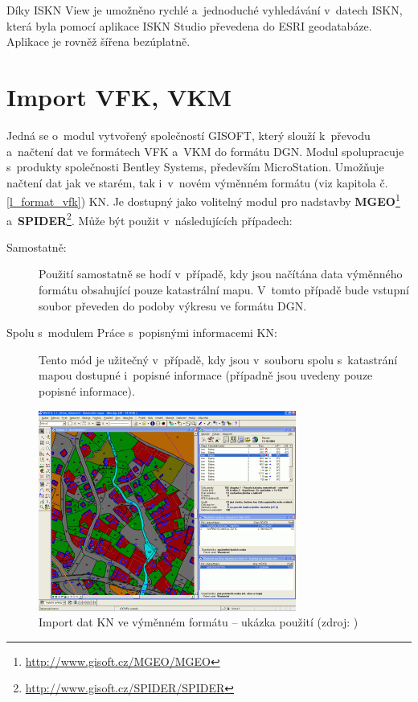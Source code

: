 \documentclass[a4paper,12pt,oneside]{book}
\begin{document}
Díky ISKN View je umožněno rychlé a~jednoduché vyhledávání v~datech
ISKN, která byla pomocí aplikace ISKN Studio převedena do 
ESRI geodatabáze.  Aplikace je rovněž šířena
bezúplatně. \cite{iskn_studio}

\newpage
\section{Import VFK, VKM}
Jedná se o~modul vytvořený společností GISOFT, který slouží k~převodu
a~načtení dat ve formátech VFK a~VKM do formátu DGN. Modul
spolupracuje s~produkty společnosti Bentley Systems, především
MicroStation. Umožňuje načtení dat jak ve starém, tak i~v~novém
výměnném formátu (viz kapitola č. \ref{l_format_vfk}) KN. Je dostupný
jako volitelný modul pro nadstavby
\textbf{MGEO}\footnote{\url{http://www.gisoft.cz/MGEO/MGEO}}
a~\textbf{SPIDER}\footnote{\url{http://www.gisoft.cz/SPIDER/SPIDER}}. Může
být použit v~následujících případech:

\begin{description}
\item[Samostatně:] Použití samostatně se hodí v~případě, kdy jsou
  načítána data výměnného formátu obsahující pouze katastrální
  mapu. V~tomto případě bude vstupní soubor převeden do podoby výkresu
  ve formátu DGN.

\item[Spolu s~modulem Práce s~popisnými informacemi KN:] Tento mód je
  užiteč\-ný v~případě, kdy jsou v~souboru spolu s~katastrání mapou
  dostupné i~popisné informace (případně jsou uvedeny pouze popisné
  informace).
\end{description}

\begin{figure}[htb]
\centering
\includegraphics[scale=1]{images/microstation_modul.png}
\caption[Import dat KN ve výměnném formátu -- ukázka použití]{Import dat KN ve výměnném formátu -- ukázka použití (zdroj: \cite{gisoft_modul})}
\end{figure}
\end{document}
